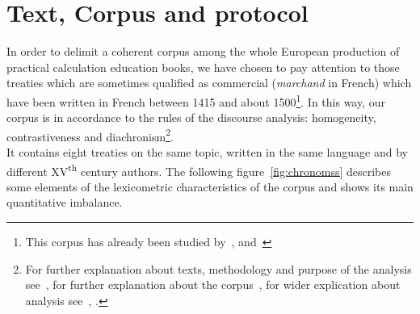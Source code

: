 \documentclass[preprint]{elsarticle}
\begin{document}
\section{Text, Corpus and protocol}\label{corpus}

In order to delimit a coherent corpus among the whole European production of practical calculation education books, we have chosen to pay attention to those treaties which are sometimes qualified as commercial (\textit{marchand} in French) which have been written in French between 1415 and about 1500\footnote{This corpus has already been studied by~\cite{beaujouanplace1988}, \cite{spiesserarithmetique2003} and~\cite{benoitrecherches1985}}. In this way, our corpus is in accordance to the rules of the discourse analysis: homogeneity, contrastiveness and diachronism\footnote{For further explanation about texts, methodology and purpose of the analysis see~\cite{lamasse2012}, for further explanation about the corpus~\cite{prost1988}, for wider explication about analysis see~\cite{Mayaffre2005}, \cite{Rastier2011}.}. \\

It contains eight treaties on the same topic, written in the same language and by different XV\textsuperscript{th} century authors. The following figure~\ref{fig:chronomss} describes some elements of the lexicometric characteristics of the corpus and shows its main quantitative imbalance.
\end{document}
